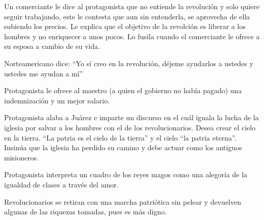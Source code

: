 \begin{compactitem}
    \item Un comerciante le dice al protagonista que no entiende la revolución y solo quiere seguir trabajando, este le contesta que aun sin entenderla, se aprovecha de ella subiendo los precios. Le explica que el objetivo de la revolción es liberar a los hombres y no enriquecer a unos pocos. Lo fusila cuando el comerciante le ofrece a su esposa a cambio de su vida.\autocite[13:01-15:00]{fernandez_enamorada_1946}
    \item Norteamericano dice: ``Yo sí creo en la revolución, déjeme ayudarlos a ustedes y ustedes me ayudan a mí''\autocite[28:46]{fernandez_enamorada_1946}
    \item Protagonista le ofrece al maestro (a quien el gobierno no había pagado) una indemnización y un mejor salario.\autocite[18:30]{fernandez_enamorada_1946}
    \item Protagonista alaba a Juárez e imparte un discurso en el cuál iguala la lucha de la iglesia por salvar a los hombres con el de los revolucionarios. Desea crear el cielo en la tierra. ``La patria es el cielo de la tierra'' y el cielo ``la patria eterna''. Insinúa que la iglesia ha perdido su camino y debe actuar como los antiguos misioneros.\autocite[22:31-25:17]{fernandez_enamorada_1946}
    \item Protagonista interpreta un cuadro de los reyes magos como una alegoría de la igualdad de clases a través del amor.\autocite[1:07:19]{fernandez_enamorada_1946}  
    \item Revolucionarios se retiran con una marcha patriótica sin pelear y devuelven algunas de las riquezas tomadas, pues es más digno.\autocite[1:27:21-1:35:20]{fernandez_enamorada_1946}  
    \end{compactitem} 

